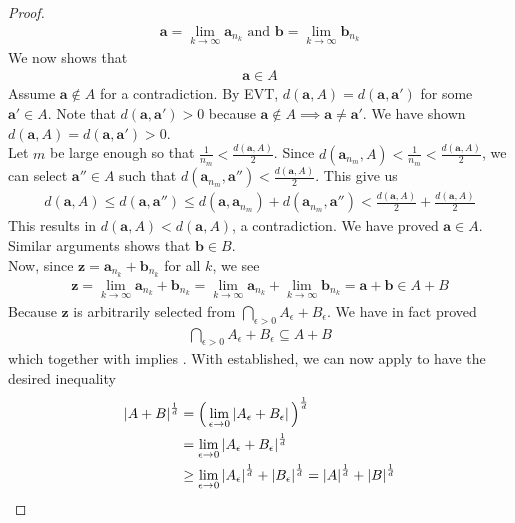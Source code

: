 \documentclass{report}
\begin{document}
\begin{proof}
\begin{align*}
\textbf{a}=\lim_{k\to \infty}\textbf{a}_{n_k}\text{ and }\textbf{b}=\lim_{k\to \infty}\textbf{b}_{n_k}
\end{align*}
We now shows that 
\begin{align*}
 \textbf{a}\in A
\end{align*}
Assume $\textbf{a} \not\in A$ for a contradiction. By EVT, $d(\textbf{a},A)=d(\textbf{a},\textbf{a}')$ for some $\textbf{a}'\in A$. Note that $d(\textbf{a},\textbf{a}')>0$ because $\textbf{a}\not\in A\implies \textbf{a}\neq \textbf{a}'$. We have shown $d(\textbf{a},A)=d(\textbf{a},\textbf{a}')>0$. \\

Let $m$ be large enough so that $\frac{1}{n_m}< \frac{d(\textbf{a},A)}{2}$. Since $d(\textbf{a}_{n_m},A)< \frac{1}{n_m}< \frac{d(\textbf{a},A)}{2}$, we can select $\textbf{a}'' \in A$ such that $d(\textbf{a}_{n_m},\textbf{a}'')< \frac{d(\textbf{a},A)}{2}$. This give us 
\begin{align*}
d(\textbf{a},A)\leq d(\textbf{a},\textbf{a}'')\leq d(\textbf{a},\textbf{a}_{n_m})+ d(\textbf{a}_{n_m},\textbf{a}'')< \frac{d(\textbf{a},A)}{2}+ \frac{d(\textbf{a},A)}{2}
\end{align*}
This results in $d(\textbf{a}, A) < d(\textbf{a}, A)$, a contradiction. We have proved $\textbf{a} \in A$. Similar arguments shows that $\textbf{b} \in B$. \\

Now, since $\textbf{z}=\textbf{a}_{n_k}+\textbf{b}_{n_k}$ for all $k$, we see 
\begin{align*}
\textbf{z}=\lim_{k\to \infty}\textbf{a}_{n_k}+\textbf{b}_{n_k}=\lim_{k\to \infty}\textbf{a}_{n_k}+\lim_{k\to \infty}\textbf{b}_{n_k}=\textbf{a}+\textbf{b} \in A+B
\end{align*}
Because $\textbf{z}$ is arbitrarily selected from $\bigcap_{\epsilon >0}A_\epsilon +B_\epsilon $. We have in fact proved 
\begin{align*}
\bigcap_{\epsilon >0}A_\epsilon +B_\epsilon  \subseteq A+B
\end{align*}
which together with  implies . With  established, we can now apply   to have the desired inequality 
\begin{align*}
  \left|A+B\right|^{\frac{1}{d}}&=\Big(\lim_{\epsilon \to 0} \left|A_\epsilon +B_\epsilon\right|  \Big)^{\frac{1}{d}}\\
  &=\lim_{\epsilon \to 0}\left|A_\epsilon +B_\epsilon \right|^{\frac{1}{d}}\\
  &\geq \lim_{\epsilon \to 0}\left|A_\epsilon \right|^{\frac{1}{d}}+ \left|B_\epsilon \right|^{\frac{1}{d}}= \left|A\right|^{\frac{1}{d}}+ \left|B\right|^{\frac{1}{d}}
\end{align*}
\end{proof}
\end{document}
